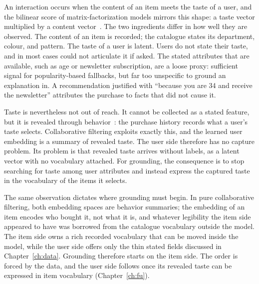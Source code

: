 

An interaction occurs when the content of an item meets the taste of a
user, and the bilinear score of matrix-factorization models mirrors this
shape: a taste vector multiplied by a content vector~\cite{koren2009mf}.
The two ingredients differ in how well they are observed. The content of
an item is recorded; the catalogue states its department, colour, and
pattern. The taste of a user is latent. Users do not state their taste,
and in most cases could not articulate it if asked. The stated attributes
that are available, such as age or newsletter subscription, are a loose
proxy: sufficient signal for popularity-based fallbacks, but far too
unspecific to ground an explanation in. A recommendation justified with
``because you are 34 and receive the newsletter'' attributes the purchase
to facts that did not cause it.

Taste is nevertheless not out of reach. It cannot be collected as a
stated feature, but it is revealed through behavior~\cite{samuelson1948consumption}:
the purchase history records what a user's taste selects. Collaborative
filtering exploits exactly this, and the learned user embedding is a
summary of revealed taste. The user side therefore has no capture
problem. Its problem is that revealed taste arrives without labels, as a
latent vector with no vocabulary attached. For grounding, the consequence
is to stop searching for taste among user attributes and instead express
the captured taste in the vocabulary of the items it selects.

The same observation dictates where grounding must begin. In pure
collaborative filtering, both embedding spaces are behavior summaries;
the embedding of an item encodes who bought it, not what it is, and
whatever legibility the item side appeared to have was borrowed from the
catalogue vocabulary outside the model. The item side owns a rich
recorded vocabulary that can be moved inside the model, while the user
side offers only the thin stated fields discussed in
Chapter~\ref{ch:data}. Grounding therefore starts on the item side. The
order is forced by the data, and the user side follows once its revealed
taste can be expressed in item vocabulary (Chapter~\ref{ch:fu}).
